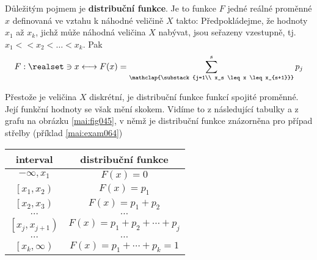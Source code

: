     \begin{mdframed}[style=highlight]
      Důležitým pojmem je \textbf{distribuční funkce}. Je to funkce \(F\) jedné reálné proměnné 
      \(x\) definovaná ve vztahu k náhodné veličině \(X\) takto: Předpokládejme, že hodnoty \(x_1\)
      až \(x_k\), jichž může náhodná veličina \(X\) nabývat, jsou seřazeny vzestupně, tj. \(x_1 <
      < x_2 < \ldots < x_k\). Pak
      \begin{equation}\label{mai:eq063}
        F: \realset\ni x\longleftrightarrow 
        F(x) = \sum_{\mathclap{\substack{j=1\\ x_s \leq x \leq x_{s+1}}}}^{s}p_j
      \end{equation}
    \end{mdframed}

    Přestože je veličina \(X\) diskrétní, je distribuční funkce funkcí spojité proměnné. Její 
    funkční hodnoty se však mění skokem. Vidíme to z následující tabulky a z grafu na obrázku 
    \ref{mai:fig045}, v němž je distribuční funkce znázorněna pro případ střelby (příklad 
    \ref{mai:exam064})

    \begin{table}[ht!]
      \centering
      \begin{tabular}{c|c}
        \textbf{interval}                 &  \textbf{distribuční funkce}             \\ \hline
            \(-\infty, x_1\)              &    \(F(x) = 0\)                         \\
            \(\left[x_1, x_2\right)\)     &    \(F(x) = p_1\)                       \\
            \(\left[x_2, x_3\right)\)     &    \(F(x) = p_1 + p_2\)                 \\
                    \(\ldots\)            &       \(\ldots\)                         \\
            \(\left[x_j, x_{j+1}\right)\) &    \(F(x) = p_1 + p_2 + \cdots + p_j\)  \\
                   \(\ldots\)             &       \(\ldots\)                         \\
            \(\left[x_k, \infty\right)\)  &    \(F(x) = p_1 + \cdots + p_k =1\)     \\ \hline
            \end{tabular}
    \end{table}


